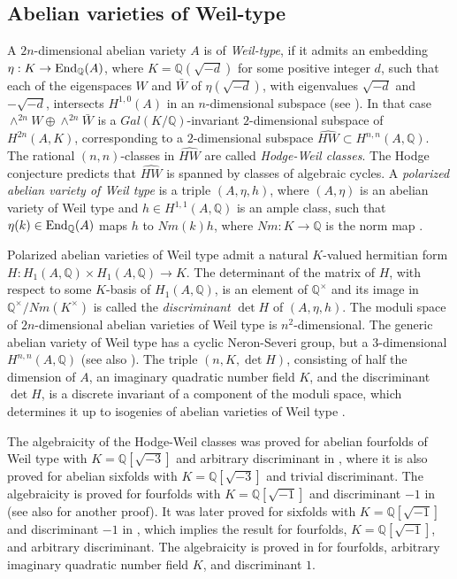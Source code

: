 \documentclass[12pt]{amsart}
\numberwithin{equation}{subsection}
\theoremstyle{plain}
\theoremstyle{definition}
\newcommand{\QQ}{{\mathbb Q}}
\newcommand{\End}{{\rm End}}
\begin{document}
\subsection{Abelian varieties of Weil-type}
\label{sec-introduction-abelian-varieties-of-Weil-type}
A $2n$-dimensional abelian variety $A$ is of {\em Weil-type}, if it admits an embedding $\eta:K\rightarrow \End_\QQ(A)$, where $K=\QQ(\sqrt{-d})$ for some positive integer $d$, such that each of the eigenspaces $W$ and $\bar{W}$ 
of $\eta(\sqrt{-d})$, with eigenvalues $\sqrt{-d}$ and $-\sqrt{-d}$, intersects $H^{1,0}(A)$ in an $n$-dimensional subspace (see \cite{weil}). 
In that case $\wedge^{2n}W\oplus \wedge^{2n}\bar{W}$ is a $Gal(K/\QQ)$-invariant $2$-dimensional subspace of $H^{2n}(A,K)$, corresponding to 
a $2$-dimensional subspace $\hat{HW}\subset H^{n,n}(A,\QQ)$. The rational $(n,n)$-classes in $\hat{HW}$ are called {\em Hodge-Weil classes}. The Hodge conjecture predicts that $\hat{HW}$ is spanned by classes of algebraic cycles. A {\em polarized abelian variety of Weil type} is a triple $(A,\eta,h)$, where $(A,\eta)$ is an abelian variety of Weil type and $h\in H^{1,1}(A,\QQ)$ is an ample class, such that $\eta(k)\in \End_\QQ(A)$ maps $h$ to $Nm(k)h$, where $Nm:K\rightarrow \QQ$ is the norm map \cite{van-Geemen,weil}. 

Polarized abelian varieties of Weil type admit a natural $K$-valued hermitian form $H:H_1(A,\QQ)\times H_1(A,\QQ)\rightarrow K$.
The determinant of the matrix of $H$, with respect to some $K$-basis of $H_1(A,\QQ)$, is an element of $\QQ^\times$ and its image in $\QQ^\times/Nm(K^\times)$ is called the {\em discriminant} $\det H$ of $(A,\eta,h)$. 
The moduli space of $2n$-dimensional abelian varieties of Weil type is $n^2$-dimensional. The generic abelian variety of Weil type has a cyclic Neron-Severi group, but a $3$-dimensional $H^{n,n}(A,\QQ)$ \cite{weil} (see also \cite[Th. 6.12]{van-Geemen}).
The triple $(n,K,\det H)$, consisting of half the dimension of $A$, an imaginary quadratic number field $K$, and the discriminant $\det H$, is a discrete invariant of a component of the moduli space, which determines it up to isogenies of abelian varieties of Weil type \cite[Th. 5.2(3)]{van-Geemen}.

The algebraicity of the Hodge-Weil classes was proved for abelian fourfolds of Weil type with $K=\QQ[\sqrt{-3}]$ and arbitrary discriminant in \cite{schoen}, where it is also proved for abelian sixfolds with $K=\QQ[\sqrt{-3}]$ and trivial discriminant.
The algebraicity is proved for fourfolds with $K=\QQ[\sqrt{-1}]$ and discriminant $-1$  in \cite{schoen1} (see also \cite{van-Geemen} for another proof).
It was later proved for sixfolds with $K=\QQ[\sqrt{-1}]$ and discriminant $-1$ in \cite{koike}, which implies the result for fourfolds, $K=\QQ[\sqrt{-1}]$, and arbitrary discriminant. The algebraicity is proved in \cite{markman-generalized-kummers} for fourfolds, arbitrary imaginary quadratic number field $K$, and discriminant $1$. 
\end{document}
